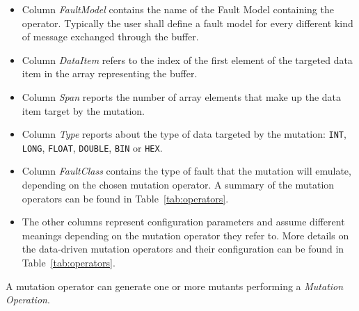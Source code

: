 \begin{itemize}
  \item Column \emph{FaultModel} contains the name of the Fault Model containing the operator. Typically the user shall define a fault model for every different kind of message exchanged through the buffer.

  \item Column \emph{DataItem} refers to the index of the first element of the targeted data item in the array representing the buffer.

  \item Column \emph{Span} reports the number of array elements that make up the data item target by the mutation.

  \item Column \emph{Type} reports about the type of data targeted by the mutation: \texttt{INT}, \texttt{LONG}, \texttt{FLOAT}, \texttt{DOUBLE}, \texttt{BIN} or \texttt{HEX}.

  \item Column \emph{FaultClass} contains the type of fault that the mutation will emulate, depending on the chosen mutation operator. A summary of the mutation operators can be found in Table~\ref{tab:operators}.

  \item The other columns represent configuration parameters and assume different meanings depending on the mutation operator they refer to. More details on the data-driven mutation operators and their configuration can be found in Table~\ref{tab:operators}.

\end{itemize}



A mutation operator can generate one or more mutants performing a \emph{Mutation Operation}.
